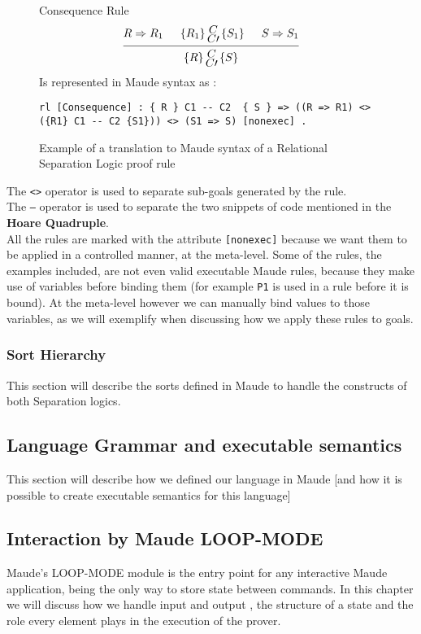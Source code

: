 \documentclass[12pt,a4paper]{article}
\newcommand{\hq}[4]{
	\left\{{#1}\right\}
	\let\scriptstyle\textstyle 
	\substack{{#2} \\ 	\let\scriptstyle\textstyle {#3}} 
	\left\{{#4}\right\}
}
\begin{document}
\begin{figure}[h]
	Consequence Rule
	\[
	\begin{prooftree}
	\Hypo{R \Rightarrow R_1}
	\Hypo{\hq{R_1}{C}{C\prime}{S_1}}
	\Hypo{S \Rightarrow S_1}
	\Infer 3 {\hq{R}{C}{C\prime}{S}}
	\end{prooftree}	
	\]
	Is represented in Maude syntax as : 
	\begin{lstlisting}[caption=Relational Separation Logic Consequence rule]
	rl [Consequence] : { R } C1 -- C2  { S } => ((R => R1) <> ({R1} C1 -- C2 {S1})) <> (S1 => S) [nonexec] .
	\end{lstlisting}
	\caption{Example of a translation to Maude syntax of a Relational Separation Logic proof rule}
	\label{fig:RSLTranslation}
\end{figure}
The \texttt{<>} operator is used to separate sub-goals generated by the rule.
\\

The \texttt{---} operator is used to separate the two snippets of code mentioned in the \textbf{Hoare Quadruple}.
\\

All the rules are marked with the attribute \texttt{[nonexec]} because we want them to be applied in a controlled manner, at the meta-level. Some of the rules, the examples included, are not even valid executable Maude rules, because they make use of variables before binding them (for example \texttt{P1} is used in a rule before it is bound). At the meta-level however we can manually bind values to those variables, as we will exemplify when discussing how we apply these rules to goals.
\subsubsection{Sort Hierarchy}
This section will describe the sorts defined in Maude to handle the constructs of both Separation logics.
\subsection{Language Grammar and executable semantics}
This section will describe how we defined our language in Maude [and how it is possible to create executable semantics for this language]
\subsection{Interaction by Maude LOOP-MODE}
Maude's LOOP-MODE module is the entry point for any interactive Maude application, being the only way to store state between commands. In this chapter we will discuss how we handle input and output , the structure of a state and the role every element plays in the execution of the prover.\\
\end{document}
